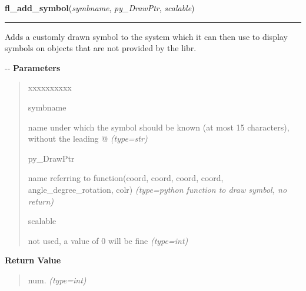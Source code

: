     \label{xformslib:flbasic:fl_add_symbol}

    \vspace{0.5ex}

\hspace{.8\funcindent}\begin{boxedminipage}{\funcwidth}

    \raggedright \textbf{fl\_add\_symbol}(\textit{symbname}, \textit{py\_DrawPtr}, \textit{scalable})

    \vspace{-1.5ex}

    \rule{\textwidth}{0.5\fboxrule}
\setlength{\parskip}{2ex}

Adds a customly drawn symbol to the system which it can then use to
display symbols on objects that are not provided by the libr.

-{}-
\setlength{\parskip}{1ex}
      \textbf{Parameters}
      \vspace{-1ex}

      \begin{quote}
        \begin{Ventry}{xxxxxxxxxx}

          \item[symbname]


name under which the symbol should be known (at most 15 characters),
without the leading @
            {\it (type=str)}

          \item[py\_DrawPtr]


name referring to function(coord, coord, coord, coord,
angle\_degree\_rotation, colr)
            {\it (type=python function to draw symbol, no return)}

          \item[scalable]


not used, a value of 0 will be fine
            {\it (type=int)}

        \end{Ventry}

      \end{quote}

      \textbf{Return Value}
    \vspace{-1ex}

      \begin{quote}

num.
      {\it (type=int)}


\end{quote}
\end{boxedminipage}
